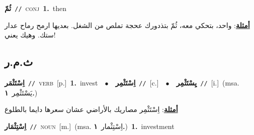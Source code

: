 \documentclass[10pt,a4paper,twoside]{article} %
\begin{document}
\begin{multicols}{2}
{\setlength\topsep{0pt}\textbf{\foreignlanguage{arabic}{ثُمّ}}\ {\color{gray}\texttt{//}\color{black}}\ \textsc{conj}\ \textbf{1.}~then\  \begin{flushright}\color{gray}\foreignlanguage{arabic}{\textbf{\underline{\foreignlanguage{arabic}{أمثلة}}}: واحد، بتحكي معه، ثُمّ بتذدورك عحجة تملص من الشغل. بعديها ارمح رماح عدار ستك. وهيك يعني!}\end{flushright}\color{black}} \vspace{2mm}

\vspace{-3mm}
\subsection*{\color{blue}\foreignlanguage{arabic}{ث.م.ر}\color{blue}{}} 

{\setlength\topsep{0pt}\textbf{\foreignlanguage{arabic}{اِسْتَثْمَر}}\ {\color{gray}\texttt{//}\color{black}}\ \textsc{verb}\ [p.]\ \textbf{1.}~invest\ \ $\bullet$\ \ \setlength\topsep{0pt}\textbf{\foreignlanguage{arabic}{اِسْتَثْمِر}}\ {\color{gray}\texttt{//}\color{black}}\ [c.]\ \ $\bullet$\ \ \setlength\topsep{0pt}\textbf{\foreignlanguage{arabic}{يِسْتَثْمِر}}\ {\color{gray}\texttt{//}\color{black}}\ [i.]\ \color{gray}(msa. \foreignlanguage{arabic}{يَسْتَثْمِر}~\foreignlanguage{arabic}{\textbf{١.}})\color{black}\  \begin{flushright}\color{gray}\foreignlanguage{arabic}{\textbf{\underline{\foreignlanguage{arabic}{أمثلة}}}: اِسْتَثْمِر مصاريك بالأراضي عشان سعرها دايما بالطلوع}\end{flushright}\color{black}} \vspace{2mm}

{\setlength\topsep{0pt}\textbf{\foreignlanguage{arabic}{اِسْتِثْمَار}}\ {\color{gray}\texttt{//}\color{black}}\ \textsc{noun}\ [m.]\ \color{gray}(msa. \foreignlanguage{arabic}{اِسْتِثْمار}~\foreignlanguage{arabic}{\textbf{١.}})\color{black}\ \textbf{1.}~investment\ } \vspace{2mm}


\end{multicols}
\end{document}
